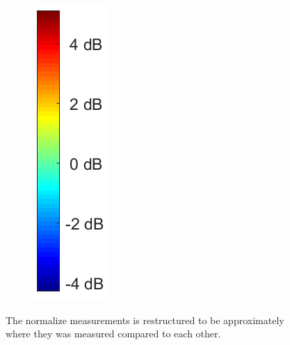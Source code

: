 \begin{figure}[H]
\begin{subfigure}[b]{0.1\textwidth}
\includegraphics[width=\textwidth]{figures/Norm_space_colorbar.png}
\end{subfigure}
\captionsetup{belowskip=-1.5em}
\caption{The normalize measurements is restructured to be approximately where they was measured compared to each other.}
\label{fig:Norm_space}
\end{figure}

